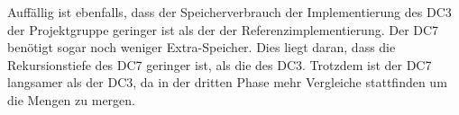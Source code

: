Auffällig ist ebenfalls, dass der Speicherverbrauch der Implementierung des DC3 der Projektgruppe geringer ist als der der Referenzimplementierung. Der DC7 benötigt sogar noch weniger Extra-Speicher. Dies liegt daran, dass die Rekursionstiefe des DC7 geringer ist, als die des DC3. Trotzdem ist der DC7 langsamer als der DC3, da in der dritten Phase mehr Vergleiche stattfinden um die Mengen zu mergen.